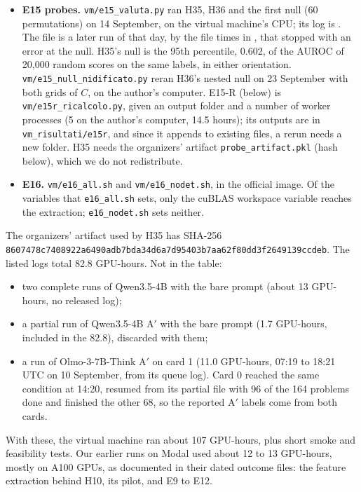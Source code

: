 \begin{itemize}
\item \textbf{E15 probes.} \texttt{vm/e15\_valuta.py} ran H35, H36 and the first null (60 permutations) on 14 September, on the virtual machine's CPU; its log is . The file  is a later run of that day, by the file times in , that stopped with an error at the null. H35's null is the 95th percentile, 0.602, of the AUROC of 20{,}000 random scores on the same labels, in either orientation. \texttt{vm/e15\_null\_nidificato.py} reran H36's nested null on 23 September with both grids of $C$, on the author's computer. E15-R (below) is \texttt{vm/e15r\_ricalcolo.py}, given an output folder and a number of worker processes (5 on the author's computer, 14.5 hours); its outputs are in \texttt{vm\_risultati/e15r}, and since it appends to existing files, a rerun needs a new folder. H35 needs the organizers' artifact \texttt{probe\_artifact.pkl} (hash below), which we do not redistribute.
\item \textbf{E16.} \texttt{vm/e16\_all.sh} and \texttt{vm/e16\_nodet.sh}, in the official image. Of the variables that \texttt{e16\_all.sh} sets, only the cuBLAS workspace variable reaches the extraction; \texttt{e16\_nodet.sh} sets neither.
\end{itemize}

The organizers' artifact used by H35 has SHA-256 {\footnotesize\texttt{8607478c7408922a6490adb7bda34d6a7d95403b7aa62f80dd3f2649139ccdeb}}. The listed logs total 82.8 GPU-hours. Not in the table:
\begin{itemize}
\item two complete runs of Qwen3.5-4B with the bare prompt (about 13 GPU-hours, no released log);
\item a partial run of Qwen3.5-4B A$'$ with the bare prompt (1.7 GPU-hours, included in the 82.8), discarded with them;
\item a run of Olmo-3-7B-Think A$'$ on card 1 (11.0 GPU-hours, 07:19 to 18:21 UTC on 10 September, from its queue log). Card 0 reached the same condition at 14:20, resumed from its partial file with 96 of the 164 problems done and finished the other 68, so the reported A$'$ labels come from both cards.
\end{itemize}
With these, the virtual machine ran about 107 GPU-hours, plus short smoke and feasibility tests. Our earlier runs on Modal used about 12 to 13 GPU-hours, mostly on A100 GPUs, as documented in their dated outcome files: the feature extraction behind H10, its pilot, and E9 to E12.

